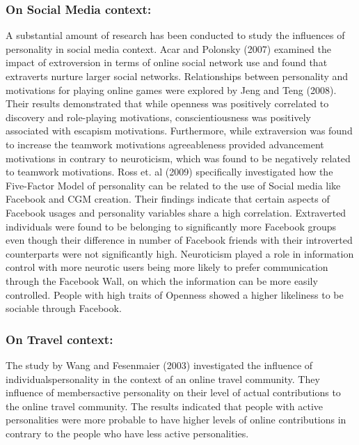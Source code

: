 \subsubsection{On Social Media context: }

A substantial amount of research has been conducted to study the influences of personality in social media context. Acar and Polonsky (2007) examined the impact of extroversion in terms of online social network use and found that extraverts nurture larger social networks\cite{acar2007online}. Relationships between personality and motivations for playing online games were explored by Jeng and Teng (2008)\cite{jeng2008personality}. Their results demonstrated that while openness was positively correlated to discovery and role-playing motivations, conscientiousness was positively associated with escapism motivations. Furthermore, while extraversion was found to increase the teamwork motivations agreeableness provided advancement motivations in contrary to neuroticism, which was found to be negatively related to teamwork motivations. Ross et. al (2009) specifically investigated how the Five-Factor Model of personality can be related to the use of Social media like Facebook and CGM creation. Their findings indicate that certain aspects of Facebook usages and personality variables share a high correlation. Extraverted individuals were found to be belonging to significantly more Facebook groups even though their difference in number of Facebook friends with their introverted counterparts were not significantly high. Neuroticism played a role in information control with more neurotic users being more likely to prefer communication through the Facebook Wall, on which the information can be more easily controlled. People with high traits of Openness showed a higher likeliness to be sociable through Facebook\cite{ross2009personality}. 


\subsubsection{On Travel context: }

The study by Wang and Fesenmaier (2003) investigated the influence of individuals\textquotesingle personality in the context of an online travel community. They influence of members\textquotesingle active personality on their level of actual contributions to the online travel community. The results indicated that people with active personalities were more probable to have higher levels of online contributions in contrary to the people who have less active personalities.


